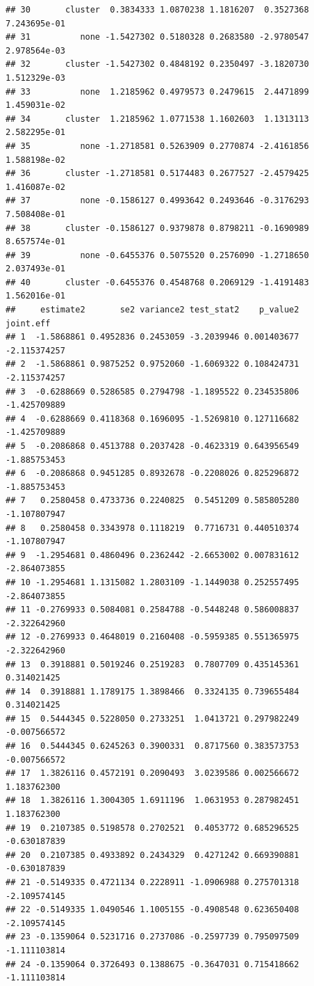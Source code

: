 \documentclass[
]{article}
\begin{document}
\begin{verbatim}
## 30       cluster  0.3834333 1.0870238 1.1816207  0.3527368 7.243695e-01
## 31          none -1.5427302 0.5180328 0.2683580 -2.9780547 2.978564e-03
## 32       cluster -1.5427302 0.4848192 0.2350497 -3.1820730 1.512329e-03
## 33          none  1.2185962 0.4979573 0.2479615  2.4471899 1.459031e-02
## 34       cluster  1.2185962 1.0771538 1.1602603  1.1313113 2.582295e-01
## 35          none -1.2718581 0.5263909 0.2770874 -2.4161856 1.588198e-02
## 36       cluster -1.2718581 0.5174483 0.2677527 -2.4579425 1.416087e-02
## 37          none -0.1586127 0.4993642 0.2493646 -0.3176293 7.508408e-01
## 38       cluster -0.1586127 0.9379878 0.8798211 -0.1690989 8.657574e-01
## 39          none -0.6455376 0.5075520 0.2576090 -1.2718650 2.037493e-01
## 40       cluster -0.6455376 0.4548768 0.2069129 -1.4191483 1.562016e-01
##     estimate2       se2 variance2 test_stat2    p_value2    joint.eff
## 1  -1.5868861 0.4952836 0.2453059 -3.2039946 0.001403677 -2.115374257
## 2  -1.5868861 0.9875252 0.9752060 -1.6069322 0.108424731 -2.115374257
## 3  -0.6288669 0.5286585 0.2794798 -1.1895522 0.234535806 -1.425709889
## 4  -0.6288669 0.4118368 0.1696095 -1.5269810 0.127116682 -1.425709889
## 5  -0.2086868 0.4513788 0.2037428 -0.4623319 0.643956549 -1.885753453
## 6  -0.2086868 0.9451285 0.8932678 -0.2208026 0.825296872 -1.885753453
## 7   0.2580458 0.4733736 0.2240825  0.5451209 0.585805280 -1.107807947
## 8   0.2580458 0.3343978 0.1118219  0.7716731 0.440510374 -1.107807947
## 9  -1.2954681 0.4860496 0.2362442 -2.6653002 0.007831612 -2.864073855
## 10 -1.2954681 1.1315082 1.2803109 -1.1449038 0.252557495 -2.864073855
## 11 -0.2769933 0.5084081 0.2584788 -0.5448248 0.586008837 -2.322642960
## 12 -0.2769933 0.4648019 0.2160408 -0.5959385 0.551365975 -2.322642960
## 13  0.3918881 0.5019246 0.2519283  0.7807709 0.435145361  0.314021425
## 14  0.3918881 1.1789175 1.3898466  0.3324135 0.739655484  0.314021425
## 15  0.5444345 0.5228050 0.2733251  1.0413721 0.297982249 -0.007566572
## 16  0.5444345 0.6245263 0.3900331  0.8717560 0.383573753 -0.007566572
## 17  1.3826116 0.4572191 0.2090493  3.0239586 0.002566672  1.183762300
## 18  1.3826116 1.3004305 1.6911196  1.0631953 0.287982451  1.183762300
## 19  0.2107385 0.5198578 0.2702521  0.4053772 0.685296525 -0.630187839
## 20  0.2107385 0.4933892 0.2434329  0.4271242 0.669390881 -0.630187839
## 21 -0.5149335 0.4721134 0.2228911 -1.0906988 0.275701318 -2.109574145
## 22 -0.5149335 1.0490546 1.1005155 -0.4908548 0.623650408 -2.109574145
## 23 -0.1359064 0.5231716 0.2737086 -0.2597739 0.795097509 -1.111103814
## 24 -0.1359064 0.3726493 0.1388675 -0.3647031 0.715418662 -1.111103814

\end{verbatim}
\end{document}
